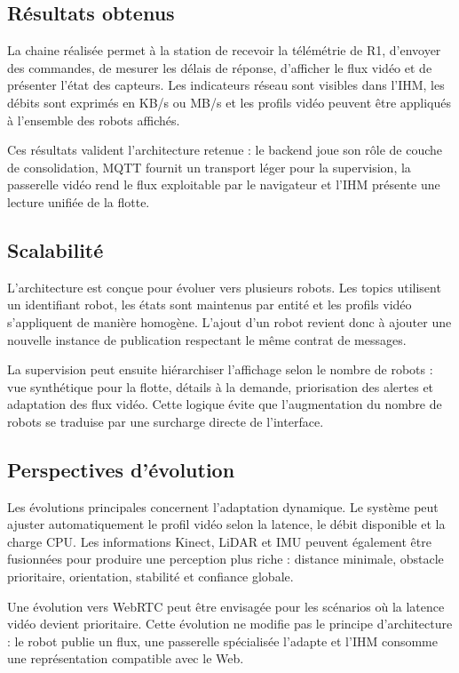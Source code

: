 \subsection{Résultats obtenus}

La chaine réalisée permet à la station de recevoir la télémétrie de R1, d'envoyer des commandes, de mesurer les délais de réponse, d'afficher le flux vidéo et de présenter l'état des capteurs. Les indicateurs réseau sont visibles dans l'IHM, les débits sont exprimés en KB/s ou MB/s et les profils vidéo peuvent être appliqués à l'ensemble des robots affichés.

Ces résultats valident l'architecture retenue : le backend joue son rôle de couche de consolidation, MQTT fournit un transport léger pour la supervision, la passerelle vidéo rend le flux exploitable par le navigateur et l'IHM présente une lecture unifiée de la flotte.

\subsection{Scalabilité}

L'architecture est conçue pour évoluer vers plusieurs robots. Les topics utilisent un identifiant robot, les états sont maintenus par entité et les profils vidéo s'appliquent de manière homogène. L'ajout d'un robot revient donc à ajouter une nouvelle instance de publication respectant le même contrat de messages.

La supervision peut ensuite hiérarchiser l'affichage selon le nombre de robots : vue synthétique pour la flotte, détails à la demande, priorisation des alertes et adaptation des flux vidéo. Cette logique évite que l'augmentation du nombre de robots se traduise par une surcharge directe de l'interface.

\subsection{Perspectives d'évolution}

Les évolutions principales concernent l'adaptation dynamique. Le système peut ajuster automatiquement le profil vidéo selon la latence, le débit disponible et la charge CPU. Les informations Kinect, LiDAR et IMU peuvent également être fusionnées pour produire une perception plus riche : distance minimale, obstacle prioritaire, orientation, stabilité et confiance globale.

Une évolution vers WebRTC peut être envisagée pour les scénarios où la latence vidéo devient prioritaire. Cette évolution ne modifie pas le principe d'architecture : le robot publie un flux, une passerelle spécialisée l'adapte et l'IHM consomme une représentation compatible avec le Web.

